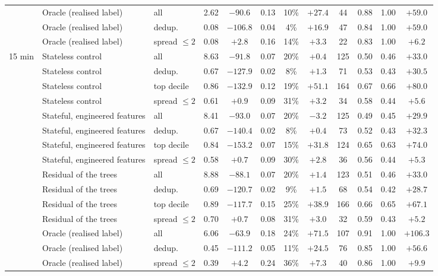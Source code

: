 \begin{table}[p]
\begin{fittable}
\begin{tabular}{lllrcccccccc}
 & Oracle (realised label) & all & 2.62 & $-90.6$ & 0.13 & 10\% & $+27.4$ & 44 & 0.88 & 1.00 & $+59.0$ \\
 & Oracle (realised label) & dedup. & 0.08 & $-106.8$ & 0.04 & 4\% & $+16.9$ & 47 & 0.84 & 1.00 & $+59.0$ \\
 & Oracle (realised label) & spread $\le 2$ & 0.08 & $+2.8$ & 0.16 & 14\% & $+3.3$ & 22 & 0.83 & 1.00 & $+6.2$ \\
\midrule
15 min & Stateless control & all & 8.63 & $-91.8$ & 0.07 & 20\% & $+0.4$ & 125 & 0.50 & 0.46 & $+33.0$ \\
 & Stateless control & dedup. & 0.67 & $-127.9$ & 0.02 & 8\% & $+1.3$ & 71 & 0.53 & 0.43 & $+30.5$ \\
 & Stateless control & top decile & 0.86 & $-132.9$ & 0.12 & 19\% & $+51.1$ & 164 & 0.67 & 0.66 & $+80.0$ \\
 & Stateless control & spread $\le 2$ & 0.61 & $+0.9$ & 0.09 & 31\% & $+3.2$ & 34 & 0.58 & 0.44 & $+5.6$ \\
 & Stateful, engineered features & all & 8.41 & $-93.0$ & 0.07 & 20\% & $-3.2$ & 125 & 0.49 & 0.45 & $+29.9$ \\
 & Stateful, engineered features & dedup. & 0.67 & $-140.4$ & 0.02 & 8\% & $+0.4$ & 73 & 0.52 & 0.43 & $+32.3$ \\
 & Stateful, engineered features & top decile & 0.84 & $-153.2$ & 0.07 & 15\% & $+31.8$ & 124 & 0.65 & 0.63 & $+74.0$ \\
 & Stateful, engineered features & spread $\le 2$ & 0.58 & $+0.7$ & 0.09 & 30\% & $+2.8$ & 36 & 0.56 & 0.44 & $+5.3$ \\
 & Residual of the trees & all & 8.88 & $-88.1$ & 0.07 & 20\% & $+1.4$ & 123 & 0.51 & 0.46 & $+33.0$ \\
 & Residual of the trees & dedup. & 0.69 & $-120.7$ & 0.02 & 9\% & $+1.5$ & 68 & 0.54 & 0.42 & $+28.7$ \\
 & Residual of the trees & top decile & 0.89 & $-117.7$ & 0.15 & 25\% & $+38.9$ & 166 & 0.66 & 0.65 & $+67.1$ \\
 & Residual of the trees & spread $\le 2$ & 0.70 & $+0.7$ & 0.08 & 31\% & $+3.0$ & 32 & 0.59 & 0.43 & $+5.2$ \\
 & Oracle (realised label) & all & 6.06 & $-63.9$ & 0.18 & 24\% & $+71.5$ & 107 & 0.91 & 1.00 & $+106.3$ \\
 & Oracle (realised label) & dedup. & 0.45 & $-111.2$ & 0.05 & 11\% & $+24.5$ & 76 & 0.85 & 1.00 & $+56.6$ \\
 & Oracle (realised label) & spread $\le 2$ & 0.39 & $+4.2$ & 0.24 & 36\% & $+7.3$ & 40 & 0.86 & 1.00 & $+9.9$ \\

\end{tabular}
\end{fittable}
\end{table}
